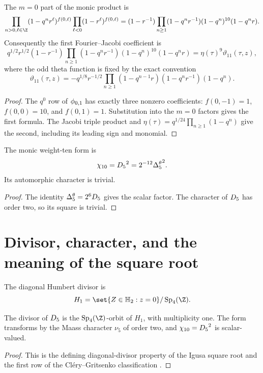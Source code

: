 \begin{proposition}
The $m=0$ part of the monic product is
\[
 \prod_{n>0,\ell\in\Z}(1-q^nr^\ell)^{f(0,\ell)}
 \prod_{\ell<0}(1-r^\ell)^{f(0,\ell)}
 =(1-r^{-1})\prod_{n\ge1}
 (1-q^nr^{-1})(1-q^n)^{10}(1-q^nr).
\]
Consequently the first Fourier--Jacobi coefficient is
\[
 q^{1/2}r^{1/2}(1-r^{-1})
 \prod_{n\ge1}(1-q^nr^{-1})(1-q^n)^{10}(1-q^nr)
 =\eta(\tau)^9\vartheta_{11}(\tau,z),
\]
where the odd theta function is fixed by the exact convention
\[
 \vartheta_{11}(\tau,z)
 =-q^{1/8}r^{-1/2}
 \prod_{n\ge1}(1-q^{n-1}r)(1-q^nr^{-1})(1-q^n).
\]
\end{proposition}
\begin{proof}
The $q^0$ row of ${\phi_{0,1}}$ has exactly three nonzero coefficients:
$f(0,-1)=1$, $f(0,0)=10$, and $f(0,1)=1$. Substitution into the $m=0$ factors gives the first formula. The Jacobi triple product and $\eta(\tau)=q^{1/24}\prod_{n\ge1}(1-q^n)$ give the second, including its leading sign and monomial.
\end{proof}

\begin{corollary}
The monic weight-ten form is
\[
 {\chi_{10}}={D_5}^2=2^{-12}{\Delta^{\theta}_5}^2.
\]
Its automorphic character is trivial.
\end{corollary}
\begin{proof}
The identity ${\Delta^{\theta}_5}=2^6{D_5}$ gives the scalar factor.  The character of ${D_5}$ has order two, so its square is trivial.
\end{proof}

\chapter{Divisor, character, and the meaning of the square root}
The diagonal Humbert divisor is
\[
 H_1=\set{Z\in\HHtwo:z=0}/\operatorname{Sp}_4(\Z).
\]

\begin{theorem}
The divisor of ${D_5}$ is the $\operatorname{Sp}_4(\Z)$-orbit of $H_1$, with multiplicity one. The form transforms by the Maass character $\nu_5$ of order two, and ${\chi_{10}}={D_5}^2$ is scalar-valued.
\end{theorem}
\begin{proof}
This is the defining diagonal-divisor property of the Igusa square root and the first row of the Cl\'ery--Gritsenko classification \cite{Igusa62,Igusa64,GC}.
\end{proof}

